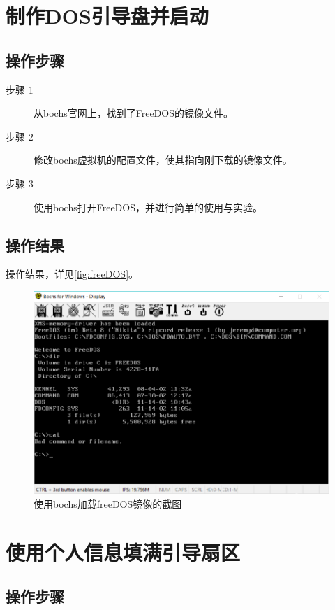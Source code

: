 \documentclass[forprint]{WHUBachelor}
\begin{document}
\section{制作DOS引导盘并启动}

\subsection{操作步骤}

\begin{description}
  \item [步骤 1] 从bochs官网上，找到了FreeDOS的镜像文件。
  \item [步骤 2] 修改bochs虚拟机的配置文件，使其指向刚下载的镜像文件。
  \item [步骤 3] 使用bochs打开FreeDOS，并进行简单的使用与实验。
\end{description}

\subsection{操作结果}

操作结果，详见\autoref{fig:freeDOS}。
\begin{figure}[htp]
  \centering
  \includegraphics[width=13cm]{"./figure/use_freeDOS.png"}
  \caption{使用bochs加载freeDOS镜像的截图}
  \label{fig:freeDOS}
\end{figure}

\section{使用个人信息填满引导扇区}

\subsection{操作步骤}
\end{document}
